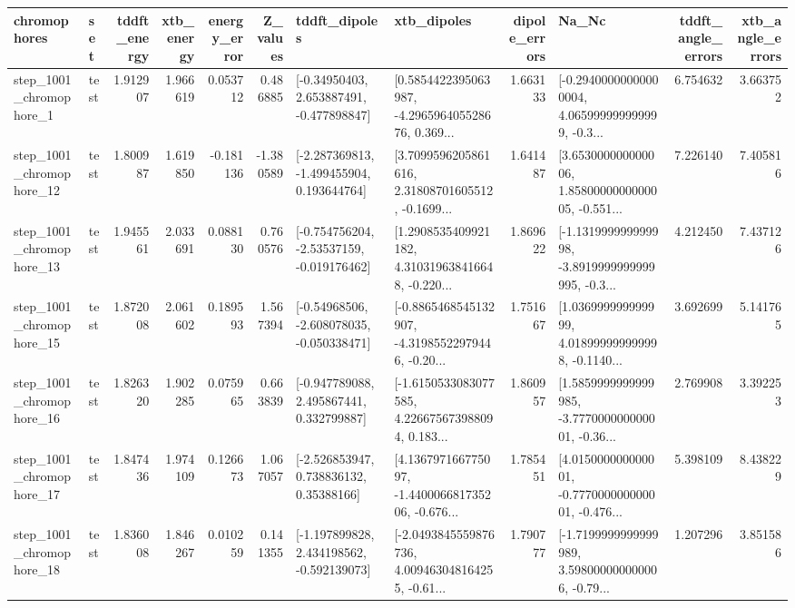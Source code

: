 \begin{tabular}{llrrrrllrlrr}
\toprule
             chromophores &       set &  tddft\_energy &  xtb\_energy &  energy\_error &  Z\_values &                               tddft\_dipoles &                                        xtb\_dipoles &  dipole\_errors &                                              Na\_Nc &  tddft\_angle\_errors &  xtb\_angle\_errors \\
\midrule
  step\_1001\_chromophore\_1 &      test &      1.912907 &    1.966619 &      0.053712 &  0.486885 &    [-0.34950403, 2.653887491, -0.477898847] &  [0.5854422395063987, -4.296596405528676, 0.369... &       1.663133 &  [-0.29400000000000004, 4.065999999999999, -0.3... &            6.754632 &          3.663752 \\
 step\_1001\_chromophore\_12 &      test &      1.800987 &    1.619850 &     -0.181136 & -1.380589 &   [-2.287369813, -1.499455904, 0.193644764] &  [3.7099596205861616, 2.31808701605512, -0.1699... &       1.641487 &  [3.653000000000006, 1.8580000000000005, -0.551... &            7.226140 &          7.405816 \\
 step\_1001\_chromophore\_13 &      test &      1.945561 &    2.033691 &      0.088130 &  0.760576 &   [-0.754756204, -2.53537159, -0.019176462] &  [1.2908535409921182, 4.310319638416648, -0.220... &       1.869622 &  [-1.131999999999998, -3.8919999999999995, -0.3... &            4.212450 &          7.437126 \\
 step\_1001\_chromophore\_15 &      test &      1.872008 &    2.061602 &      0.189593 &  1.567394 &   [-0.54968506, -2.608078035, -0.050338471] &  [-0.8865468545132907, -4.31985522979446, -0.20... &       1.751667 &  [1.036999999999999, 4.018999999999998, -0.1140... &            3.692699 &          5.141765 \\
 step\_1001\_chromophore\_16 &      test &      1.826320 &    1.902285 &      0.075965 &  0.663839 &    [-0.947789088, 2.495867441, 0.332799887] &  [-1.6150533083077585, 4.226675673988094, 0.183... &       1.860957 &  [1.5859999999999985, -3.777000000000001, -0.36... &            2.769908 &          3.392253 \\
 step\_1001\_chromophore\_17 &      test &      1.847436 &    1.974109 &      0.126673 &  1.067057 &     [-2.526853947, 0.738836132, 0.35388166] &  [4.136797166775097, -1.440006681735206, -0.676... &       1.785451 &  [4.015000000000001, -0.777000000000001, -0.476... &            5.398109 &          8.438229 \\
 step\_1001\_chromophore\_18 &      test &      1.836008 &    1.846267 &      0.010259 &  0.141355 &   [-1.197899828, 2.434198562, -0.592139073] &  [-2.0493845559876736, 4.009463048164255, -0.61... &       1.790777 &  [-1.7199999999999989, 3.598000000000006, -0.79... &            1.207296 &          3.851586 \\

\end{tabular}
